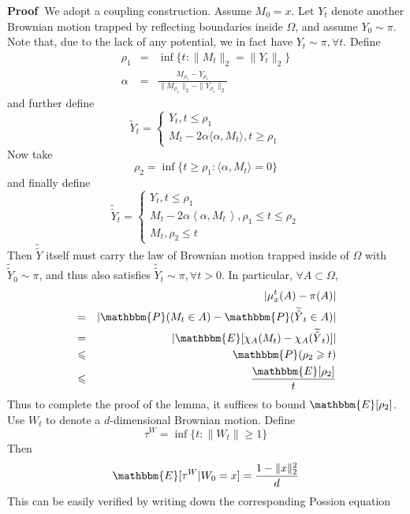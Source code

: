 \documentclass[english, aip, jcp, priprint, graphicx]{revtex4-1}
\theoremstyle{plain}
\theoremstyle{definition}
\theoremstyle{plain}
\begin{document}
\noindent\textbf{Proof\ }We adopt a coupling construction. Assume $M_0 = x$.
Let $Y_t$ denote another Brownian motion trapped by reflecting boundaries
inside $\Omega$, and assume $Y_0 \sim \pi$. Note that, due to the lack of any
potential, we in fact have $Y_t \sim \pi, \forall t$. Define
\begin{eqnarray*}
\rho_1 & = & \inf \{ t : \| M_t \|_2 = \| Y_t \|_2 \}\\
\alpha & = & \frac{M_{\rho_1} - Y_{\rho_1}}{\| M_{\rho_1} \|_2 - \|
Y_{\rho_1} \|_2}
\end{eqnarray*}
and further define
\[ \tilde{Y}_t = \left\{ \begin{array}{l}
Y_t, t \leqslant \rho_1\\
M_t - 2 \alpha \langle \alpha, M_t \rangle, t \geqslant \rho_1
\end{array} \right. \]
Now take
\[ \rho_2 = \inf \{ t \geqslant \rho_1 : \langle \alpha, M_t \rangle = 0 \} \]
and finally define
\[ \widetilde{\tilde{Y}}_t = \left\{ \begin{array}{l}
Y_t, t \leqslant \rho_1\\
M_t - 2 \alpha \left\langle \alpha, M_{t \,} \right\rangle, \rho_1
\leqslant t \leqslant \rho_2\\
M_t, \rho_2 \leqslant t
\end{array} \right. \]
Then $\widetilde{\tilde{Y}}$ itself must carry the law of Brownian motion
trapped inside of $\Omega$ with $\widetilde{\tilde{Y}}_0 \sim \pi$, and thus
also satisfies $\widetilde{\tilde{Y}}_t \sim \pi, \forall t > 0$. In
particular, $\forall A \subset \Omega$,
\begin{eqnarray*}
&  & | \mu_x^t (A) - \pi (A) |\\
& = & | \mathbbm{P} (M_t \in A) -\mathbbm{P} (\widetilde{\tilde{Y}}_t \in
A) |\\
& = & | \mathbbm{E} [\chi_A (M_t) - \chi_A (\widetilde{\tilde{Y}}_t)] |\\
& \leqslant & \mathbbm{P} (\rho_2 \geqslant t)\\
& \leqslant & \frac{\mathbbm{E} [\rho_2]}{t}
\end{eqnarray*}
Thus to complete the proof of the lemma, it suffices to bound $\mathbbm{E}
[\rho_2]$. Use $W_t$ to denote a $d$-dimensional Brownian motion. Define
\[ \tau^W = \inf \{ t : \| W_t \| \geqslant 1 \} \]
Then
\begin{equation}
\mathbbm{E} [\tau^W |W_0 = x] = \frac{1 - \| x \|_2^2}{d}
\label{equ:expectation}
\end{equation}
This can be easily verified by writing down the corresponding Possion equation
\end{document}

